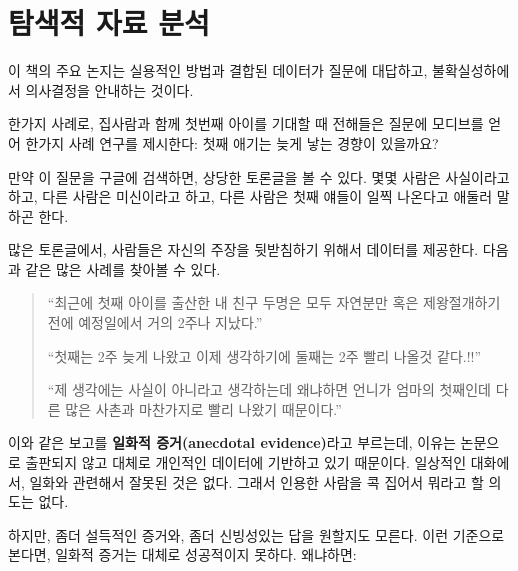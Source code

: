 
\chapter{탐색적 자료 분석}
\label{intro}
이 책의 주요 논지는 실용적인 방법과 결합된 데이터가 질문에 대답하고, 불확실성하에서 의사결정을 안내하는 것이다.

한가지 사례로, 집사람과 함께 첫번째 아이를 기대할 때 전해들은 질문에 모디브를 얻어 한가지 사례 연구를 제시한다: 첫째 애기는 늦게 낳는 경향이 있을까요?  

만약 이 질문을 구글에 검색하면, 상당한 토론글을 볼 수 있다. 몇몇 사람은 사실이라고하고, 다른 사람은 미신이라고 하고,
다른 사람은 첫째 얘들이 일찍 나온다고 애둘러 말하곤 한다. 

많은 토론글에서, 사람들은 자신의 주장을 뒷받침하기 위해서 데이터를 제공한다. 다음과 같은 많은 사례를 찾아볼 수 있다.


\begin{quote}

``최근에 첫째 아이를 출산한 내 친구 두명은 모두 자연분만 혹은 제왕절개하기 전에 예정일에서 거의 2주나 지났다.''


``첫째는 2주 늦게 나왔고 이제 생각하기에 둘째는 2주 빨리 나올것 같다.!!''

``제 생각에는 사실이 아니라고 생각하는데 왜냐하면 언니가 엄마의 첫째인데 다른 많은 사촌과 마찬가지로 빨리 나왔기 때문이다.''

\end{quote}

이와 같은 보고를 {\bf 일화적 증거(anecdotal evidence)}라고 부르는데, 이유는 논문으로 출판되지 않고 대체로 개인적인 데이터에 기반하고 있기 때문이다. 일상적인 대화에서, 일화와 관련해서 잘못된 것은 없다. 그래서 인용한 사람을 콕 집어서 뭐라고 할 의도는 없다.

하지만, 좀더 설득적인 증거와, 좀더 신빙성있는 답을 원할지도 모른다. 이런 기준으로 본다면, 일화적 증거는 대체로 성공적이지 못하다. 왜냐하면:

